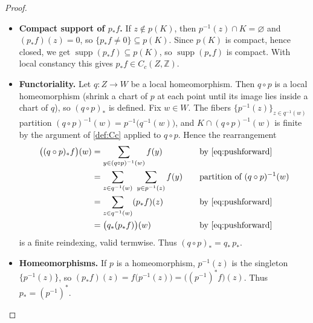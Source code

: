 \documentclass[10pt,a4paper]{amsart}
\newcommand{\Z}{\mathbb{Z}}
\newcommand{\step}[1]{\textbf{#1}}
\DeclareMathOperator{\supp}{supp}
\begin{document}
\begin{proof}
\begin{itemize}
\begin{equation}
\begin{aligned}
&=(p_*f)(z).&&\quad\text{by \eqref{eq:pushforward}}
\end{aligned}
\end{equation}
As \(z\in Z\) was arbitrary, \(p_*f\) is locally constant.
\item \step{Compact support of \(p_*f\).}
If \(z\notin p(K)\), then \(p^{-1}(z)\cap K=\varnothing\) and \((p_*f)(z)=0\), so \(\{p_*f\neq0\}\subseteq p(K)\).
Since \(p(K)\) is compact, hence closed, we get \(\supp(p_*f)\subseteq p(K)\), so \(\supp(p_*f)\) is compact.
With local constancy this gives \(p_*f\in C_c(Z,\Z)\).
\item \step{Functoriality.}
Let \(q\colon Z\to W\) be a local homeomorphism.
Then \(q\circ p\) is a local homeomorphism (shrink a chart of \(p\) at each point until its image lies inside a chart of \(q\)), so \((q\circ p)_*\) is defined.
Fix \(w\in W\).
The fibers \(\{p^{-1}(z)\}_{z\in q^{-1}(w)}\) partition \((q\circ p)^{-1}(w)=p^{-1}\bigl(q^{-1}(w)\bigr)\), and \(K\cap(q\circ p)^{-1}(w)\) is finite by the argument of \cref{def:Cc} applied to \(q\circ p\).
Hence the rearrangement
\begin{equation}\label{eq:pf-functorial}
\begin{aligned}
\bigl((q\circ p)_*f\bigr)(w)
&=\sum_{y\in(q\circ p)^{-1}(w)}f(y)&&\quad\text{by \eqref{eq:pushforward}}\\
&=\sum_{z\in q^{-1}(w)}\ \sum_{y\in p^{-1}(z)}f(y)&&\quad\text{partition of \((q\circ p)^{-1}(w)\)}\\
&=\sum_{z\in q^{-1}(w)}(p_*f)(z)&&\quad\text{by \eqref{eq:pushforward}}\\
&=\bigl(q_*(p_*f)\bigr)(w)&&\quad\text{by \eqref{eq:pushforward}}
\end{aligned}
\end{equation}
is a finite reindexing, valid termwise.
Thus \((q\circ p)_*=q_*\,p_*\).
\item \step{Homeomorphisms.}
If \(p\) is a homeomorphism, \(p^{-1}(z)\) is the singleton \(\{p^{-1}(z)\}\), so \((p_*f)(z)=f\bigl(p^{-1}(z)\bigr)=\bigl((p^{-1})^*f\bigr)(z)\). Thus \(p_*=(p^{-1})^*\).\qedhere
\end{itemize}
\end{proof}
\end{document}

